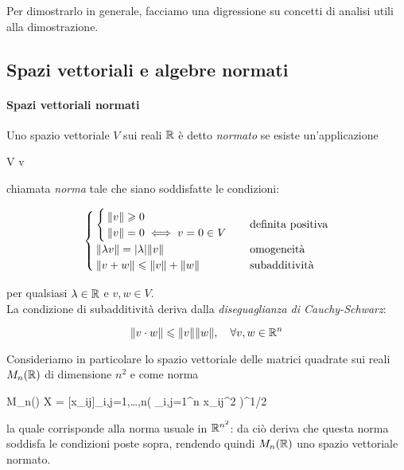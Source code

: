 Per dimostrarlo in generale, facciamo una digressione su concetti di analisi utili alla dimostrazione.

\subsection{Spazi vettoriali e algebre normati}

\paragraph{Spazi vettoriali normati}

Uno spazio vettoriale $ V $ sui reali $ \mathbb{R} $ è detto \textit{normato} se esiste un'applicazione

\map{\norm{\cdot}}
	{V}{\R}
	{v}{}

chiamata \textit{norma} tale che siano soddisfatte le condizioni:

\begin{equation}
	\begin{cases}
		\begin{cases}
			\norm{v} \geqslant 0 \\
			\norm{v} = 0 \iff v = 0 \in V
		\end{cases} & \text{definita positiva} \\
		\norm{\lambda v} = \abs{\lambda} \norm{v} & \text{omogeneità} \\
		\norm{v + w} \leqslant \norm{v} + \norm{w} & \text{subadditività}
	\end{cases}
\end{equation}

per qualsiasi $ \lambda \in \mathbb{R} $ e $ v,w \in V $.\\
La condizione di subadditività deriva dalla \textit{diseguaglianza di Cauchy-Schwarz}:

\begin{equation}
	\norm{v \cdot w} \leqslant \norm{v} \norm{w} \qcomma \forall v,w \in \R^{n}
\end{equation}

Consideriamo in particolare lo spazio vettoriale delle matrici quadrate sui reali $ M_{n}(\mathbb{R}) $ di dimensione $ n^{2} $ e come norma

\map{\norm{}}
	{M_{n}(\R)}{\R}
	{X = [x_{ij}]_{i,j=1,\dots,n}}{\left( \sum_{i,j=1}^{n} x_{ij}^{2} \right)^{1/2}}
	
la quale corrisponde alla norma usuale in $ \mathbb{R}^{n^{2}} $: da ciò deriva che questa norma soddisfa le condizioni poste sopra, rendendo quindi $ M_{n}(\mathbb{R}) $ uno spazio vettoriale normato.\\

